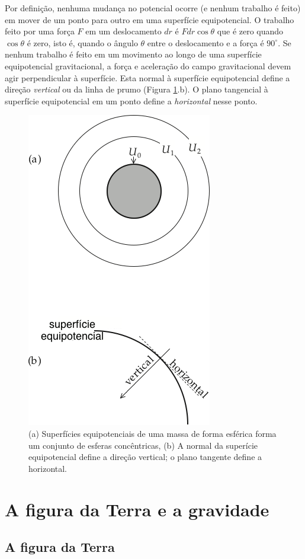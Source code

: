 \documentclass[]{book}
\theoremstyle{definition}
\theoremstyle{definition}
\theoremstyle{definition}
\theoremstyle{remark}
\begin{document}
Por definição, nenhuma mudança no potencial ocorre (e nenhum trabalho é feito) em mover de um ponto para outro em uma superfície equipotencial. O trabalho feito por uma força \(F\) em um deslocamento \(dr\) é \(Fdr\cos{\theta}\) que é zero quando \(\cos{\theta}\) é zero, isto é, quando o ângulo \(\theta\) entre o deslocamento e a força é \(90^\circ\). Se nenhum trabalho é feito em um movimento ao longo de uma superfície equipotencial gravitacional, a força e aceleração do campo gravitacional devem agir perpendicular à superfície. Esta normal à superfície equipotencial define a direção \emph{vertical} ou da linha de prumo (Figura \ref{fig:potencial}.b). O plano tangencial à superfície equipotencial em um ponto define a \emph{horizontal} nesse ponto.

\begin{figure}

{\centering \includegraphics[width=0.4\linewidth]{fig/Fig_02.06} 

}

\caption{(a) Superfícies equipotenciais de uma massa de forma esférica forma um conjunto de esferas concêntricas, (b) A normal da superície equipotencial define a direção vertical; o plano tangente define a horizontal.}\label{fig:potencial}
\end{figure}

\hypertarget{a-figura-da-terra-e-a-gravidade}{%
\section{A figura da Terra e a gravidade}\label{a-figura-da-terra-e-a-gravidade}}

\hypertarget{a-figura-da-terra}{%
\subsection{A figura da Terra}\label{a-figura-da-terra}}
\end{document}
